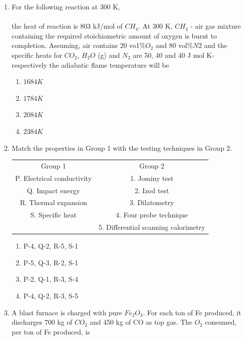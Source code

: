 \documentclass[journal]{IEEEtran}
\theoremstyle{remark}
\begin{document}
\begin{enumerate}
\item  For the following reaction at 300 K,\\
\\
the heat of reaction is 803 kJ/mol of $CH_4$. At 300 K, $CH_4$ - air gas mixture containing the required stoichiometric amount of oxygen is burnt to completion. Assuming, air contains 20 vo1$\% O_2$ and
80 vol$\% N2$ and the specific heats for $CO_2$, $H_2O$ (g) and $N_2$ are 50, 40 and 40 J mol K- respectively the adiabatic flame temperature will be
 \hfill{}
\begin{multicols}{4}
\begin{enumerate}
\item  $1684 K$
\item $1784 K$
\item  $2084 K$
\item  $2384 K$
\end{enumerate}
\end{multicols}

\item   Match the properties in Group 1 with the testing techniques in Group 2.
\hfill{}
\begin{center}
    \begin{tabular}{c c}
    Group 1     &Group 2  \\
   P. Electrical conductivity      & 1. Jominy test\\
   Q. Impact energy &2. Izod test\\
   R. Thermal expansion&3. Dilatometry\\
   S. Specific heat&4. Four probe technique\\
     &5. Differential scanning calorimetry


    \end{tabular}
\end{center}
\begin{multicols}{2}
\begin{enumerate}
\item P-4, Q-2, R-5, S-1
\item P-5, Q-3, R-2, S-1
\item  P-2, Q-1, R-3, S-4
\item  P-4, Q-2, R-3, S-5
\end{enumerate}
\end{multicols}

\item   A blast furnace is charged with pure $Fe_2O_3$. For each ton of Fe produced, it discharges 700 kg of $CO_2$ and 450 kg of CO as top gas. The $O_2$ consumed, per ton of Fe produced, is
\hfill{}


\end{enumerate}
\end{document}
